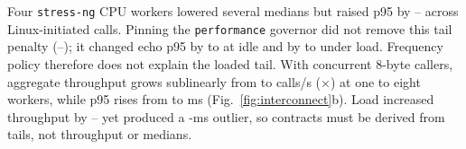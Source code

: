 \documentclass[conference]{IEEEtran}
\begin{document}
Four \texttt{stress-ng} CPU workers lowered several medians but raised p95 by
\IcSchedutilLoadPninetyfiveMin{}--\IcSchedutilLoadPninetyfiveMax{} across
Linux-initiated calls. Pinning the \texttt{performance} governor did not remove
this tail penalty (\IcPerformanceLoadPninetyfiveMin{}--\IcPerformanceLoadPninetyfiveMax{});
it changed echo p95 by \IcGovernorIdlePninetyfiveMin{} to
\IcGovernorIdlePninetyfiveMax{} at idle and by \IcGovernorLoadedPninetyfiveMin{}
to \IcGovernorLoadedPninetyfiveMax{} under load. Frequency policy therefore does
not explain the loaded tail. With concurrent 8-byte callers, aggregate
throughput grows sublinearly from \IcConcOneIdleCallsPerSec{} to
\IcConcEightIdleCallsPerSec{} calls/s (\IcConcScaling$\times$) at one to eight
workers, while p95 rises from \IcConcOneIdlePninetyfive{} to
\IcConcEightIdlePninetyfive{} ms (Fig.~\ref{fig:interconnect}b). Load increased
throughput by \IcConcLoadedGainMin{}--\IcConcLoadedGainMax{} yet produced a
\IcConcLoadedMaxMs-ms outlier, so contracts must be derived from tails, not
throughput or medians.
\end{document}
